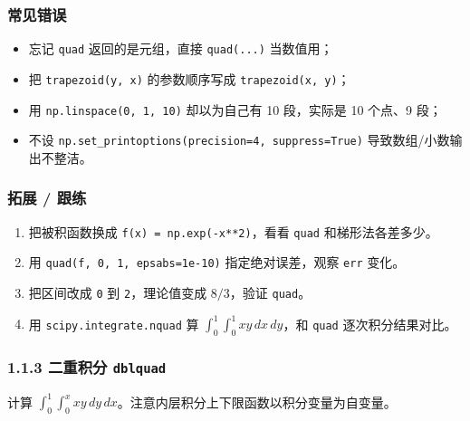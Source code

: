 \subsubsection{常见错误}\label{ux5e38ux89c1ux9519ux8bef-14}

\begin{itemize}
\tightlist
\item
  忘记 \texttt{quad} 返回的是元组，直接 \texttt{quad(...)} 当数值用；
\item
  把 \texttt{trapezoid(y,\ x)} 的参数顺序写成
  \texttt{trapezoid(x,\ y)}；
\item
  用 \texttt{np.linspace(0,\ 1,\ 10)} 却以为自己有 10 段，实际是 10
  个点、9 段；
\item
  不设 \texttt{np.set\_printoptions(precision=4,\ suppress=True)}
  导致数组/小数输出不整洁。
\end{itemize}

\subsubsection{拓展 / 跟练}\label{ux62d3ux5c55-ux8ddfux7ec3-3}

\begin{enumerate}
\def\labelenumi{\arabic{enumi}.}
\tightlist
\item
  把被积函数换成 \texttt{f(x)\ =\ np.exp(-x**2)}，看看 \texttt{quad}
  和梯形法各差多少。
\item
  用 \texttt{quad(f,\ 0,\ 1,\ epsabs=1e-10)} 指定绝对误差，观察
  \texttt{err} 变化。
\item
  把区间改成 \texttt{0} 到 \texttt{2}，理论值变成 \(8/3\)，验证
  \texttt{quad}。
\item
  用 \texttt{scipy.integrate.nquad} 算
  \(\int_0^1\int_0^1 x y\,dx\,dy\)，和 \texttt{quad} 逐次积分结果对比。
\end{enumerate}

\subsubsection{\texorpdfstring{1.1.3 二重积分
\texttt{dblquad}}{1.1.3 二重积分 dblquad}}\label{ux4e8cux91cdux79efux5206-dblquad}

计算
\(\int_0^1\int_0^x x y\, dy\, dx\)。注意内层积分上下限函数以积分变量为自变量。

\begin{Shaded}
\begin{Highlighting}[]

    \OperatorTok{*}

\OperatorTok{=}\NormalTok{, }\NormalTok{, }\NormalTok{, }
\end{Highlighting}
\end{Shaded}

